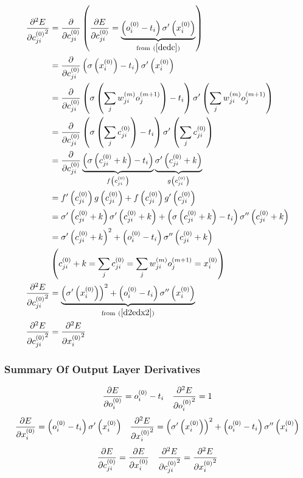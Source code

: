 \begin{align}
\pdv[2]{E}{{c_{ji}^{(0)}}} &=
\pdv{}{c_{ji}^{(0)}} 
\left(\pdv{E}{c_{ji}^{(0)}} = 
\underbrace{\left(o_{i}^{(0)} - t_{i} \right) \sigma^{\prime}\left(x_{i}^{(0)}\right)}
_{\text{from} \ (\ref{dedc})}
\right)
\\
&=\pdv{}{c_{ji}^{(0)}}\left(\sigma\left(x_{i}^{(0)}\right) - t_{i} \right) \sigma^{\prime}\left(x_{i}^{(0)}\right)
\\
&=\pdv{}{c_{ji}^{(0)}}\left(\sigma\left(\sum\limits_j {w_{ji}^{(m)}}{ o_{j}^{(m + 1)}}\right) - t_{i} \right) \sigma^{\prime}\left(\sum\limits_j {w_{ji}^{(m)}}{ o_{j}^{(m + 1)}}\right)
\\
&=\pdv{}{c_{ji}^{(0)}}\left(\sigma\left(\sum\limits_j {c_{ji}^{(0)}}\right) - t_{i} \right) \sigma^{\prime}\left(\sum\limits_j {c_{ji}^{(0)}}\right)
\\
&=\pdv{}{c_{ji}^{(0)}}
\underbrace{\left(\sigma\left({c_{ji}^{(0)}} + k\right) - t_{i} \right)}
_{f\left(c_{ji}^{(0)}\right)}
\underbrace{\sigma^{\prime}\left({c_{ji}^{(0)}} + k\right)}
_{g\left(c_{ji}^{(0)}\right)}
\\
&=f^{\prime}\left(c_{ji}^{(0)}\right)g\left(c_{ji}^{(0)}\right) + f\left(c_{ji}^{(0)}\right)g^{\prime}\left(c_{ji}^{(0)}\right)
\\
&=\sigma^{\prime}\left({c_{ji}^{(0)}} + k\right)\sigma^{\prime}\left({c_{ji}^{(0)}} + k\right) + 
\left(\sigma\left({c_{ji}^{(0)}} + k\right) - t_{i} \right)\sigma^{\prime\prime}\left({c_{ji}^{(0)}} + k\right)
\\
&=\sigma^{\prime}\left({c_{ji}^{(0)}} + k\right)^2 + 
\left(o_{i}^{(0)} - t_{i} \right)\sigma^{\prime\prime}\left({c_{ji}^{(0)}} + k\right)
\\
&\left(c_{ji}^{(0)} + k = \sum_j{c_{ji}^{(0)}} = \sum\limits_j {w_{ji}^{(m)}}{ o_{j}^{(m + 1)}} = x_{i}^{(0)} \right)
\\
\pdv[2]{E}{{c_{ji}^{(0)}}}&=
\underbrace{\left(\sigma^{\prime}\left(x_{i}^{(0)}\right)\right)^2 + 
\left(o_{i}^{(0)} - t_{i} \right)\sigma^{\prime\prime}\left(x_{i}^{(0)}\right)}
_{\text{from} \ (\ref{d2edx2})}
\\
\pdv[2]{E}{{c_{ji}^{(0)}}} &= \pdv[2]{E}{{x_{i}^{(0)}}}
\end{align}
\subsubsection{Summary Of Output Layer Derivatives}
\begin{align}
&\pdv{E}{o_{i}^{(0)}} = o_{i}^{(0)} - t_{i} 
&
\pdv[2]{E}{{o_{i}^{(0)}}} = 1
\end{align}
\begin{align}
&\pdv{E}{x_{i}^{(0)}} = \left(o_{i}^{(0)} - t_{i}\right)\sigma^{\prime}\left(x_{i}^{(0)}\right)
& 
\pdv[2]{E}{{x_{i}^{(0)}}} = \left(\sigma^{\prime}\left(x_{i}^{(0)}\right)\right)^2 + \left(o_{i}^{(0)} - t_{i}\right)\sigma^{\prime\prime}\left(x_{i}^{(0)}\right)
\end{align}
\begin{align}
&\pdv{E}{{c_{ji}^{(0)}}} = \pdv{E}{{x_{i}^{(0)}}}
&
\pdv[2]{E}{{c_{ji}^{(0)}}} = \pdv[2]{E}{{x_{i}^{(0)}}}
\end{align}
